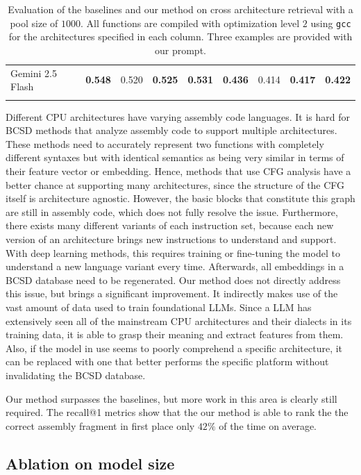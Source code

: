 {\begin{table}[!t]
{\begin{tabular}{l|cccc|cccc}
    Gemini 2.5 Flash       & \bf 0.548       & 0.520               & \bf 0.525        & \bf 0.531 & \bf 0.436       & 0.414               & \bf 0.417        & \bf 0.422 \\ \Xhline{2\arrayrulewidth}
    \end{tabular}
    }
    \caption{Evaluation of the baselines and our method on cross architecture retrieval with a pool size of \(1000\).
    All functions are compiled with optimization level \(2\) using \texttt{gcc} for the architectures specified in each column.
    Three examples are provided with our prompt.}
    \label{x-arch}
    \end{table}
}

Different CPU architectures have varying assembly code languages. It is hard for BCSD methods that analyze assembly code to support
multiple architectures. These methods need to accurately represent two functions with completely different syntaxes but with identical
semantics as being very similar in terms of their feature vector or embedding. Hence, methods that use CFG analysis have a better chance
at supporting many architectures, since the structure of the CFG itself is architecture agnostic. However, the basic blocks that constitute
this graph are still in assembly code, which does not fully resolve the issue. Furthermore, there exists many different variants of each
instruction set, because each new version of an architecture brings new instructions to understand and support. With deep learning methods,
this requires training or fine-tuning the model to understand a new language variant every time. Afterwards, all embeddings in a BCSD database need to
be regenerated. Our method does not directly address this issue, but brings a significant improvement. It indirectly makes use of the vast
amount of data used to train foundational LLMs. Since a LLM has extensively seen all of the mainstream CPU architectures and their dialects
in its training data, it is able to grasp their meaning and extract features from them. Also, if the model in use seems to poorly comprehend a
specific architecture, it can be replaced with one that better performs the specific platform without invalidating the BCSD database.

Our method surpasses the baselines, but more work in this area is clearly still required. The recall@1 metrics show that the our method
is able to rank the the correct assembly fragment in first place only \(42\%\) of the time on average.

\subsection{Ablation on model size}


